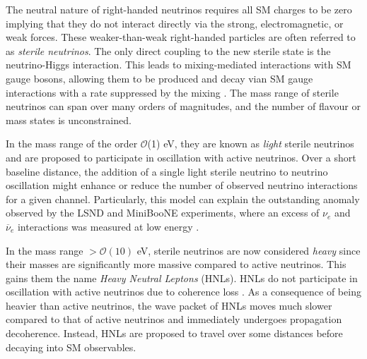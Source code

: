 The neutral nature of right-handed neutrinos requires all SM charges to be zero implying that they do not interact directly via the strong, electromagnetic, or weak forces.
These weaker-than-weak right-handed particles are often referred to as \textit{sterile neutrinos}.
The only direct coupling to the new sterile state is the neutrino-Higgs interaction.
This leads to mixing-mediated interactions with SM gauge bosons, allowing them to be produced and decay vian SM gauge interactions with a rate suppressed by the mixing \cite{SBNHNL}.
The mass range of sterile neutrinos can span over many orders of magnitudes, and the number of flavour or mass states is unconstrained.

In the mass range of the order $\mathcal{O}$(1) eV, they are known as \textit{light} sterile neutrinos and are proposed to participate in oscillation with active neutrinos.
Over a short baseline distance, the addition of a single light sterile neutrino to neutrino oscillation might enhance or reduce the number of observed neutrino interactions for a given channel. 
Particularly, this model can explain the outstanding anomaly observed by the LSND and MiniBooNE experiments, where an excess of $\nu_e$ and $\overline{\nu}_e$ interactions was measured at low energy \cite{LSND_anomaly, Miniboone_anomaly, HNLWhitePaper}. 

In the mass range $> \mathcal{O}(10)$ eV, sterile neutrinos are now considered \textit{heavy} since their masses are significantly more massive compared to active neutrinos.
This gains them the name \textit{Heavy Neutral Leptons} (HNLs).
HNLs do not participate in oscillation with active neutrinos due to coherence loss \cite{SBNHNL}.
As a consequence of being heavier than active neutrinos, the wave packet of HNLs moves much slower compared to that of active neutrinos and immediately undergoes propagation decoherence.
Instead, HNLs are proposed to travel over some distances before decaying into SM observables.


